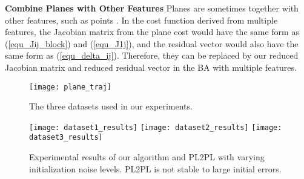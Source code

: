 \documentclass{vgtc}                          %
\begin{document}
\textbf{Combine Planes with Other Features} \quad  %
Planes are sometimes together with other features, such as points \cite{taguchi2013point,wang2019submap,grant2019efficient,yang2019tightly,li2019robust}. In the  cost function derived from multiple features, the Jacobian matrix  from the plane cost would have the same form as (\ref{equ_Jij_block}) and (\ref{equ_J1j}), and the  residual vector  would also have the same form as (\ref{equ_delta_ij}). Therefore,  they can  be replaced by our reduced Jacobian matrix and reduced residual vector in the BA with    multiple features.

\begin{figure*}[tb]
	\centering %
	\texttt{[image: plane\_traj]}  
	\caption{The three datasets used in our experiments.} 
	\label{fig:dataset}
\end{figure*}

\begin{figure*}[!h]
	\centering %
	\texttt{[image: dataset1\_results]}
	\texttt{[image: dataset2\_results]}
	\texttt{[image: dataset3\_results]} 
	\caption{Experimental results of our algorithm and PL2PL \cite{geneva2018lips} with varying initialization noise levels. PL2PL is not stable to large initial errors.} 
	\label{fig:results}
\end{figure*}
\end{document}
